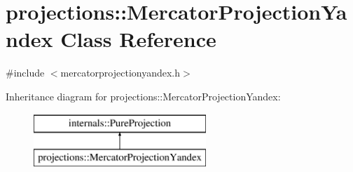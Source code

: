 \hypertarget{classprojections_1_1_mercator_projection_yandex}{\section{projections\-:\-:\-Mercator\-Projection\-Yandex \-Class \-Reference}
\label{classprojections_1_1_mercator_projection_yandex}
}


{\ttfamily \#include $<$mercatorprojectionyandex.\-h$>$}

\-Inheritance diagram for projections\-:\-:\-Mercator\-Projection\-Yandex\-:\begin{figure}[H]
\begin{center}
\leavevmode
\includegraphics[height=2.000000cm]{classprojections_1_1_mercator_projection_yandex}
\end{center}
\end{figure}
